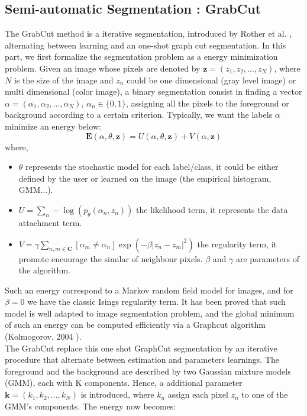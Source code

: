 \documentclass[runningheads]{llncs}
\newcommand{\bfE}{\mathbf{E}}
\newcommand{\bfz}{\mathbf{z}}
\begin{document}
\subsection{Semi-automatic Segmentation : GrabCut}
The GrabCut method is a iterative segmentation, introduced by Rother et al. \cite{Rother:2004}, alternating between learning and an one-shot graph cut segmentation. In this part, we  first formalize the segmentation problem as a energy minimization problem. Given an image whose pixels are denoted by $\bfz=(z_1,z_2,...,z_N)$, where $N$ is the size of the image and $z_n$ could be one dimensional (gray level image) or multi dimensional (color image), a binary segmentation consist in finding a vector $\alpha=(\alpha_1,\alpha_2,...,\alpha_N)$, $\alpha_n\in\{0,1\}$, assigning all the pixels to the foreground or background according to a certain criterion. Typically, we want the labels $\alpha$ minimize an energy below:
\begin{equation}
\bfE(\alpha,\theta,\bfz)=U(\alpha,\theta,\bfz)+V(\alpha,\bfz)
\end{equation}
where,
  \begin{itemize}
  \item $\theta$ represents the stochastic model for each label/class, it could be either defined by the user or learned on the image (the empirical histogram, GMM...).
  \item $U=\sum_n -\log(p_\theta (\alpha_n,z_n))$ the likelihood term, it represents the data attachment term. 
  \item $V=\gamma \sum_{n,m\in \mathbf{C}}[\alpha_m \neq \alpha_n] \exp(-\beta|z_n-z_m|^2)$ the regularity term, it promote encourage the similar of neighbour pixels. $\beta$ and $\gamma$ are parameters of the algorithm. 
  \end{itemize}
Such an energy correspond to a Markov random field model for images, and for $\beta=0$ we have the classic Isings regularity term. It has been proved that such model is well adapted to image segmentation problem, and the global minimum of such an energy can be computed efficiently via a Graphcut algorithm (Kolmogorov, 2004 \cite{Kolmogorov:2004}).\\
The GrabCut replace this one shot GraphCut segmentation by an iterative procedure that alternate between estimation and parameters learnings. The foreground and the background are described by two Gaussian mixture models (GMM), each with K components. Hence, a additional parameter $\mathbf{k}=(k_1,k_2,...,k_N)$ is introduced, where $k_n$ assign each pixel $z_n$ to one of the GMM's components. The energy now becomes:
\end{document}
